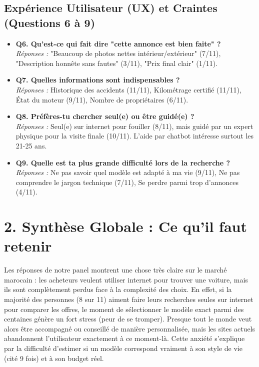 \documentclass[a4paper, 11pt]{article}
\begin{document}
\subsection*{Expérience Utilisateur (UX) et Craintes (Questions 6 à 9)}
\begin{itemize}[label=\textbullet, leftmargin=*]
    \item \textbf{Q6. Qu'est-ce qui fait dire "cette annonce est bien faite" ?} \\
    \textit{Réponses :} "Beaucoup de photos nettes intérieur/extérieur" (7/11), "Description honnête sans fautes" (3/11), "Prix final clair" (1/11).
    
    \item \textbf{Q7. Quelles informations sont indispensables ?} \\
    \textit{Réponses :} Historique des accidents (11/11), Kilométrage certifié (11/11), État du moteur (9/11), Nombre de propriétaires (6/11).
    
    \item \textbf{Q8. Préfères-tu chercher seul(e) ou être guidé(e) ?} \\
    \textit{Réponses :} Seul(e) sur internet pour fouiller (8/11), mais guidé par un expert physique pour la visite finale (10/11). L'aide par chatbot intéresse surtout les 21-25 ans.
    
    \item \textbf{Q9. Quelle est ta plus grande difficulté lors de la recherche ?} \\
    \textit{Réponses :} Ne pas savoir quel modèle est adapté à ma vie (9/11), Ne pas comprendre le jargon technique (7/11), Se perdre parmi trop d'annonces (4/11).
\end{itemize}

\vspace{0.8cm}

\newpage
\section*{2. Synthèse Globale : Ce qu'il faut retenir}

Les réponses de notre panel montrent une chose très claire sur le marché marocain : les acheteurs veulent utiliser internet pour trouver une voiture, mais ils sont complètement perdus face à la complexité des choix. En effet, si la majorité des personnes (8 sur 11) aiment faire leurs recherches seules sur internet pour comparer les offres, le moment de sélectionner le modèle exact parmi des centaines génère un fort stress (peur de se tromper). Presque tout le monde veut alors être accompagné ou conseillé de manière personnalisée, mais les sites actuels abandonnent l'utilisateur exactement à ce moment-là. Cette anxiété s'explique par la difficulté d'estimer si un modèle correspond vraiment à son style de vie (cité 9 fois) et à son budget réel. 
\end{document}
